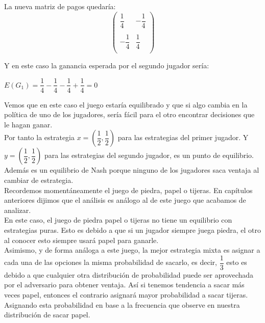 \documentclass[10pt,a4paper]{book}
\begin{document}
La nueva matriz de pagos quedaría:\\

$$
\left(
\begin{array}{cccc}
\dfrac{1}{4} &  -\dfrac{1}{4} \\
\\
-\dfrac{1}{4} & \dfrac{1}{4} \\

\end{array}
\right)
$$

Y en este caso la ganancia esperada por el segundo jugador sería:\\

\begin{center}

$E(G_1)=\dfrac{1}{4}-\dfrac{1}{4}-\dfrac{1}{4}+\dfrac{1}{4}=0$

\end{center}

Vemos que en este caso el juego estaría equilibrado y que si algo cambia en la política de uno de los jugadores, sería fácil para el otro encontrar decisiones que le hagan ganar.\\

Por tanto la estrategia  $x=(\dfrac{1}{2},\dfrac{1}{2})$ para las estrategias del primer jugador. Y $y=(\dfrac{1}{2},\dfrac{1}{2})$ para las estrategias del segundo jugador, es un punto de equilibrio. Además es un equilibrio de Nash porque ninguno de los jugadores saca ventaja al cambiar de estrategia.\\

Recordemos momentáneamente el juego de piedra, papel o tijeras. En capítulos anteriores dijimos que el análisis es análogo al de este juego que acabamos de analizar. \\

En este caso, el juego de piedra papel o tijeras no tiene un equilibrio con estrategias puras. Esto es debido a que si un jugador siempre juega piedra, el otro al conocer esto siempre usará papel para ganarle.\\
Asimismo, y de forma análoga a este juego, la mejor estrategia mixta es asignar a cada una de las opciones la misma probabilidad de sacarlo, es decir, $\dfrac{1}{3}$ esto es debido a que cualquier otra distribución de probabilidad puede ser aprovechada por el adversario para obtener ventaja. Así si tenemos tendencia a sacar más veces papel, entonces el contrario asignará mayor probabilidad a sacar tijeras. Asignando esta probabilidad en base a la frecuencia que observe en nuestra distribución de sacar papel.\\
\end{document}
